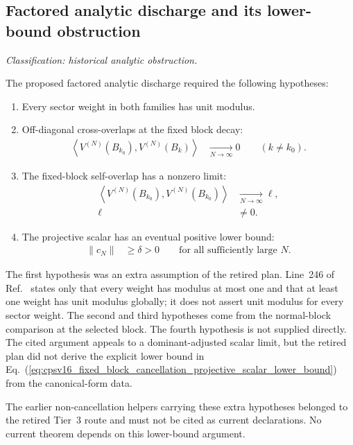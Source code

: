 \documentclass{article}
\begin{document}
\subsection{Factored analytic discharge and its lower-bound obstruction}

\textit{Classification: historical analytic obstruction.}

The proposed factored analytic discharge required the following hypotheses:
\begin{enumerate}
    \item Every sector weight in both families has unit modulus.
    \item Off-diagonal cross-overlaps at the fixed block decay:
    \begin{align}
        \left\langle
            V^{(N)}(B_{k_0}),V^{(N)}(B_k)
        \right\rangle
            &\xrightarrow[N\to\infty]{}0
            \qquad (k\neq k_0).
        \label{eq:cpsv16_fixed_block_cancellation_fixed_block_off_diagonal_decay}
    \end{align}
    \item The fixed-block self-overlap has a nonzero limit:
    \begin{align}
        \left\langle
            V^{(N)}(B_{k_0}),V^{(N)}(B_{k_0})
        \right\rangle
            &\xrightarrow[N\to\infty]{}\ell,
    \label{eq:cpsv16_fixed_block_cancellation_fixed_block_self_overlap_limit}\\
        \ell
            &\neq 0.
    \label{eq:cpsv16_fixed_block_cancellation_nonzero_self_overlap_limit}
    \end{align}
    \item The projective scalar has an eventual positive lower bound:
    \begin{align}
        \lVert c_N\rVert
            &\geq\delta>0
            \qquad\text{for all sufficiently large }N.
        \label{eq:cpsv16_fixed_block_cancellation_projective_scalar_lower_bound}
    \end{align}
\end{enumerate}

The first hypothesis was an extra assumption of the retired plan. Line~246 of
Ref.~\cite{Cirac2016MPDO_arXiv} states only that every weight has modulus at
most one and that at least one weight has unit modulus globally; it does not
assert unit modulus for every sector weight. The second and third hypotheses
come from the normal-block comparison at the selected block. The fourth
hypothesis is not supplied directly. The cited argument appeals to a
dominant-adjusted scalar limit, but the retired plan did not derive the
explicit lower bound in
Eq.~(\ref{eq:cpsv16_fixed_block_cancellation_projective_scalar_lower_bound})
from the canonical-form data.

The earlier non-cancellation helpers carrying these extra hypotheses belonged
to the retired Tier~3 route and must not be cited as current declarations. No
current theorem depends on this lower-bound argument.



\end{document}
